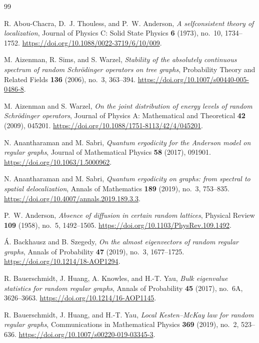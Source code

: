 \begin{thebibliography}{99}

R. Abou-Chacra, D.~J. Thouless, and P.~W. Anderson,
\emph{A selfconsistent theory of localization},
Journal of Physics C: Solid State Physics \textbf{6} (1973), no.~10, 1734--1752.
\url{https://doi.org/10.1088/0022-3719/6/10/009}.

M. Aizenman, R. Sims, and S. Warzel,
\emph{Stability of the absolutely continuous spectrum of random Schr\"odinger operators on tree graphs},
Probability Theory and Related Fields \textbf{136} (2006), no.~3, 363--394.
\url{https://doi.org/10.1007/s00440-005-0486-8}.

M. Aizenman and S. Warzel,
\emph{On the joint distribution of energy levels of random Schr\"odinger operators},
Journal of Physics A: Mathematical and Theoretical \textbf{42} (2009), 045201.
\url{https://doi.org/10.1088/1751-8113/42/4/045201}.

N. Anantharaman and M. Sabri,
\emph{Quantum ergodicity for the Anderson model on regular graphs},
Journal of Mathematical Physics \textbf{58} (2017), 091901.
\url{https://doi.org/10.1063/1.5000962}.

N. Anantharaman and M. Sabri,
\emph{Quantum ergodicity on graphs: from spectral to spatial delocalization},
Annals of Mathematics \textbf{189} (2019), no.~3, 753--835.
\url{https://doi.org/10.4007/annals.2019.189.3.3}.

P.~W. Anderson,
\emph{Absence of diffusion in certain random lattices},
Physical Review \textbf{109} (1958), no.~5, 1492--1505.
\url{https://doi.org/10.1103/PhysRev.109.1492}.

\'A. Backhausz and B. Szegedy,
\emph{On the almost eigenvectors of random regular graphs},
Annals of Probability \textbf{47} (2019), no.~3, 1677--1725.
\url{https://doi.org/10.1214/18-AOP1294}.

R. Bauerschmidt, J. Huang, A. Knowles, and H.-T. Yau,
\emph{Bulk eigenvalue statistics for random regular graphs},
Annals of Probability \textbf{45} (2017), no.~6A, 3626--3663.
\url{https://doi.org/10.1214/16-AOP1145}.

R. Bauerschmidt, J. Huang, and H.-T. Yau,
\emph{Local Kesten--McKay law for random regular graphs},
Communications in Mathematical Physics \textbf{369} (2019), no.~2, 523--636.
\url{https://doi.org/10.1007/s00220-019-03345-3}.


\end{thebibliography}
